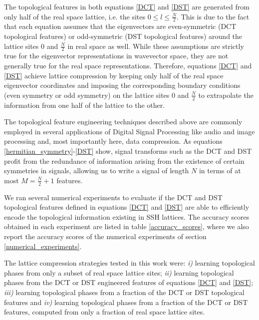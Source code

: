 \documentclass[10pt]{revtex4-1}
\begin{document}
The topological features in both equations \eqref{DCT} and \eqref{DST} are generated from only half of the real space lattice, i.e. the sites $0 \leq l \leq \frac{N}{2}$. This is due to the fact that each equation assumes that the eigenvectors are even-symmetric (DCT topological features) or odd-symmetric (DST topological features) around the lattice sites $0$ and $\frac{N}{2}$ in real space as well. While these assumptions are strictly true for the eigenvector representations in wavevector space, they are not generally true for the real space representations. Therefore, equations \eqref{DCT} and \eqref{DST} achieve lattice compression by keeping only half of the real space eigenvector coordinates and imposing the corresponding boundary conditions (even symmetry or odd symmetry) on the lattice sites $0$ and $\frac{N}{2}$ to extrapolate the information from one half of the lattice to the other. 

The topological feature engineering techniques described above are commonly employed in several applications of Digital Signal Processing like audio and image processing and, most importantly here, data compression. As equations \eqref{hermitian_symmetry}-\eqref{DST} show, signal transforms such as the DCT and DST profit from the redundance of information arising from the existence of certain symmetries in signals, allowing us to write a signal of length $N$ in terms of at most $M = \frac{N}{2}+1$ features. 
   
We ran several numerical experiments to evaluate if the DCT and DST topological features defined in equations \eqref{DCT} and \eqref{DST}  are able to efficiently encode the topological information existing in SSH lattices. The accuracy scores obtained in each experiment are listed in table \ref{accuracy_scores}, where we also report the accuracy scores of the numerical experiments of section \ref{numerical_experiments}.

The lattice compression strategies tested in this work were: \emph{i)} learning topological phases from only a subset of real space lattice sites; \emph{ii)} learning topological phases from the DCT or DST engineered features of equations \eqref{DCT} and \eqref{DST}; \emph{iii)} learning topological phases from a fraction of the DCT or DST topological features and \emph{iv)} learning topological phases from a fraction of the DCT or DST features, computed from only a fraction of real space lattice sites. 
\end{document}
